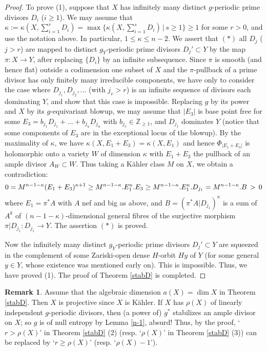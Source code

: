 \documentclass[11pt,a4paper,psamsfonts]{amsart}
\theoremstyle{plain}
\theoremstyle{definition}
\newtheorem{remark}[thm]{Remark}
\theoremstyle{remark}
\begin{document}
\begin{proof}
To prove (1),
suppose that $X$ has infinitely many distinct $g$-periodic prime divisors
$D_i$ ($i \ge 1$). We may assume that $\kappa := \kappa(X, \sum_{i=1}^r D_i) =
\max\{\kappa(X, \sum_{i=1}^s D_i) \, | \, s \ge 1\} \ge 1$ for some $r > 0$,
and use the notation above. In particular, $1 \le \kappa \le n-2$.
We assert that $(*)$ all $D_j$ ($j > r$) are mapped to
distinct $g_Y$-periodic prime divisors $D_j' \subset Y$
by the map $\pi : X \to Y$, after replacing $\{D_i\}$ by an infinite subsequence.
Since $\pi$ is smooth (and hence flat) outside a codimension one subset of $X$
and the $\pi$-pullback of a prime divisor has only finitely many irreducible components,
we have only to consider the case where $D_{j_1}, D_{j_2}, \dots$ (with $j_v > r$)
is an infinite sequence of divisors each dominating $Y$, and show that this case is impossible.
Replacing $g$ by its power and $X$ by its $g$-equivariant blowup,
we may assume that $|E_3|$ is base point free for some
$E_3 = b_{j_1}D_{j_1} + \dots + b_{j_u} D_{j_u}$ with $b_{j_v} \in {\mathbb{Z}}_{\ge 1}$,
and $D_{j_1}$ dominates $Y$ (notice that some components of $E_3$ are in the
exceptional locus of the blowup).
By the maximality of $\kappa$, we have $\kappa(X, E_1 + E_3) = \kappa(X, E_1)$
and hence $\Phi_{|E_1+ E_3|}$ is holomorphic onto a variety $W$ of dimension $\kappa$
with $E_1 + E_3$ the pullback of an ample divisor $A_W \subset W$.
Thus taking a K\"ahler class $M$ on $X$, we obtain
a contradiction:
$$
0 = M^{n-1-\kappa} (E_1 + E_3)^{\kappa + 1} \ge M^{n-1-\kappa} . E_1^{\kappa} . E_3 \ge
M^{n-1-\kappa} . E_1^{\kappa} . D_{j_1} \\
= M^{n-1-\kappa} . B \, > \, 0
$$
where $E_1 = \pi^*A$ with $A$ nef and big as above, and $B = (\pi^*A | D_{j_1})^{\kappa}$
is a sum of $A^k$ of $(n-1-\kappa)$-dimensional general fibres of 
the surjective morphism $\pi|D_{j_1} : D_{j_1} \to Y$.
The assertion $(*)$ is proved.

Now the infinitely many distinct $g_Y$-periodic prime divisors $D_j' \subset Y$
are squeezed in
the complement of some Zariski-open dense $H$-orbit $Hy$ of $Y$ (for some general $y \in Y$,
whose existence was mentioned early on). 
This is impossible.
Thus, we have proved (1). The proof of
Theorem \ref{stabD} is completed.
\end{proof}

\begin{remark} \label{rstabD}
Assume that the algebraic dimension $a(X) = \dim X$ in Theorem \ref{stabD}. 
Then $X$ is projective since $X$
is K\"ahler. If $X$ has $\rho(X)$ of linearly independent
$g$-periodic divisors, then (a power of) $g^*$ stabilizes an ample divisor on
$X$; so $g$ is of null entropy by Lemma \ref{n-1}, absurd!
Thus, by the proof, `$r > \rho(X)$' in Theorem \ref{stabD} (2)
(resp. `$\rho(X)$' in Theorem \ref{stabD} (3)) can be replaced by
`$r \ge \rho(X)$' (resp. `$\rho(X) - 1$').
\end{remark}
\end{document}
